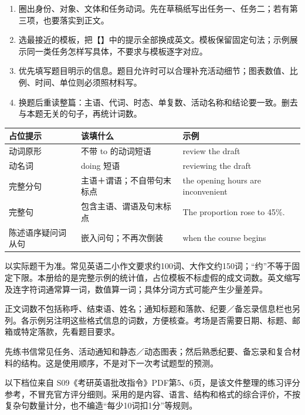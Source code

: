 \documentclass[11pt,a4paper,fontset=macnew]{ctexart}
\begin{document}
\par\vspace{4pt}{\bfseries 按下面的顺序套用}\par\nopagebreak
\begin{enumerate}\item 圈出身份、对象、文体和任务动词。先在草稿纸写出任务一、任务二；若有第三项，也要落实到正文。\item 选最接近的模板，把【】中的提示全部换成英文。模板保留固定句法；示例展示同一类任务怎样写具体，不要求与模板逐字对应。\item 优先填写题目明示的信息。题目允许时可以合理补充活动细节；图表数值、比例、时间、单位则必须照材料写。\item 换题后重读整篇：主语、代词、时态、单复数、活动名称和结论要一致。删去与本题无关的句子，再统计词数。\end{enumerate}
\begin{longtable}{L{28mm}L{60mm}L{65mm}}\toprule
\textbf{占位提示} & \textbf{该填什么} & \textbf{示例}\\\midrule\endhead
动词原形 & 不带 to 的动词短语 & review the draft\\
动名词 & doing 短语 & reviewing the draft\\
完整分句 & 主语＋谓语；不自带句末标点 & the opening hours are inconvenient\\
完整句 & 包含主语、谓语及句末标点 & The proportion rose to 45\%.\\
陈述语序疑问词从句 & 嵌入问句；不再次倒装 & when the course begins\\
\bottomrule\end{longtable}
\par\vspace{4pt}{\bfseries 字数、格式和优先顺序}\par\nopagebreak
以实际题干为准。常见英语二小作文要求约100词、大作文约150词；“约”不等于固定下限。本册给的是完整示例的统计值，占位模板不标虚假的成文词数。英文缩写及连字符词通常算一词，数值算一词；具体分词方式可能产生少量差异。

正文词数不包括称呼、结束语、姓名；通知标题和落款、纪要／备忘录信息栏也另列。各示例另注明这些格式信息的词数，方便核查。考场是否需要日期、标题、邮箱或特定落款，先看题目要求。

先练书信常见任务、活动通知和静态／动态图表；然后熟悉纪要、备忘录和复合材料的结构。这是使用顺序，不是对下一次考试题型的预测。

\clearpage\par\vspace{4pt}{\bfseries 以用户给定批改指令为标准}\par\nopagebreak
以下档位来自 S09《考研英语批改指令》PDF第5、6页，是该文件整理的练习评分参考，不冒充官方评分细则。采用的是内容、语言、结构和格式的综合评价，不按复杂句数量计分，也不编造“每少10词扣1分”等规则。
\end{document}
